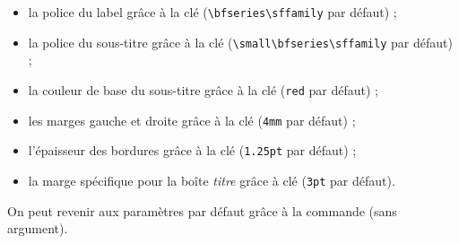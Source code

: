 \documentclass[french,11pt,a4paper]{article}
\begin{document}
\begin{itemize}
	\item la police du label grâce à la clé \MontreCode{[PoliceTitre=...]} (\verb*|\bfseries\sffamily| par défaut) ;
	\item la police du sous-titre grâce à la clé \MontreCode{[PoliceSousTitre=...]} (\verb*|\small\bfseries\sffamily| par défaut) ;
	\item la couleur de base du sous-titre grâce à la clé \MontreCode{[CouleurSousTitre=...]} (\verb*|red| par défaut) ;
	\item les marges gauche et droite grâce à la clé \MontreCode{[Marge=...]} (\verb*|4mm| par défaut) ;
	\item l'épaisseur des bordures grâce à la clé \MontreCode{[EpaisseurBordure=...]} (\verb*|1.25pt| par défaut) ;
	\item la marge spécifique pour la boîte \textit{titre} grâce à clé \MontreCode{[MargeTitre=...]} (\verb*|3pt| par défaut).
\end{itemize}

\begin{codehigh}[language=latex/latex2,style/main=cyan!10,style/code=cyan!10]
\ParamBoites[%
    Marge=2cm,MargeTitre=2mm,%
    PoliceTitre=\large\bfseries\ttfamily,%
    PoliceSousTitre=\scriptsize\bfseries\sffamily,%
    CouleurSousTitre=orange]
\end{codehigh}

\ParamBoites[Marge=2cm,MargeTitre=2mm,PoliceTitre=\large\bfseries\ttfamily,PoliceSousTitre=\scriptsize\bfseries\sffamily,CouleurSousTitre=orange]

\begin{demohigh}[language=latex/latex2,style/main=cyan!10,style/code=cyan!10]
\begin{BoiteDeDemo}[SousTitre={- Un petit sous-titre -}]
\lipsum[1][1-2]
\end{BoiteDeDemo}
\end{demohigh}

On peut revenir aux paramètres par défaut grâce à la commande  (sans argument).

\begin{demohigh}[language=latex/latex2,style/main=cyan!10,style/code=cyan!10]
\ParamBoites
\begin{BoiteDeDemo}[SousTitre={- Un petit sous-titre -}]
\lipsum[1][1-2]
\end{BoiteDeDemo}
\end{demohigh}
\end{document}
